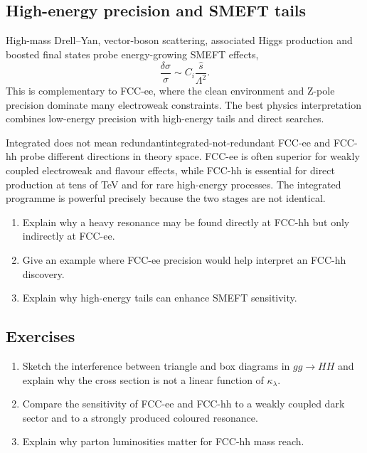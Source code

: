 \documentclass[11pt,a4paper]{article}
\numberwithin{equation}{section}
\begin{document}
\subsection{High-energy precision and SMEFT tails}
High-mass Drell--Yan, vector-boson scattering, associated Higgs production and boosted final states probe energy-growing SMEFT effects,
\begin{equation}
  \frac{\delta\sigma}{\sigma}\sim C_i\frac{\hat s}{\Lambda^2} .
\end{equation}
This is complementary to FCC-ee, where the clean environment and Z-pole precision dominate many electroweak constraints. The best physics interpretation combines low-energy precision with high-energy tails and direct searches.

\begin{remarkbox}{Integrated does not mean redundant}{integrated-not-redundant}
FCC-ee and FCC-hh probe different directions in theory space. FCC-ee is often superior for weakly coupled electroweak and flavour effects, while FCC-hh is essential for direct production at tens of TeV and for rare high-energy processes. The integrated programme is powerful precisely because the two stages are not identical.
\end{remarkbox}

\begin{guidedchecksbox}
\begin{enumerate}[leftmargin=1.6em]
\item Explain why a heavy resonance may be found directly at FCC-hh but only indirectly at FCC-ee.
\item Give an example where FCC-ee precision would help interpret an FCC-hh discovery.
\item Explain why high-energy tails can enhance SMEFT sensitivity.
\end{enumerate}
\end{guidedchecksbox}

\subsection{Exercises}
\begin{enumerate}[leftmargin=1.6em]
\item Sketch the interference between triangle and box diagrams in \(gg\to HH\) and explain why the cross section is not a linear function of \(\kappa_\lambda\).
\item Compare the sensitivity of FCC-ee and FCC-hh to a weakly coupled dark sector and to a strongly produced coloured resonance.
\item Explain why parton luminosities matter for FCC-hh mass reach.
\end{enumerate}
\end{document}
